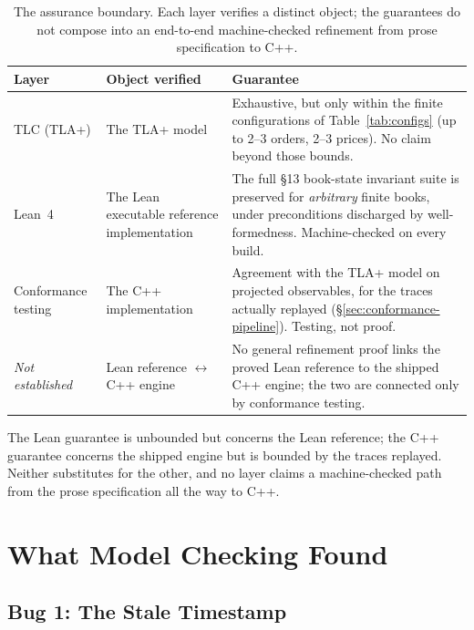 \documentclass[11pt,a4paper]{article}
\begin{document}
\begin{table}[H]
\centering
\caption{The assurance boundary. Each layer verifies a distinct object;
the guarantees do not compose into an end-to-end machine-checked
refinement from prose specification to C++.}
\label{tab:assurance}
\small
\begin{tabular}{@{}lL{3.9cm}L{6.4cm}@{}}
\toprule
Layer & Object verified & Guarantee \\
\midrule
TLC (TLA+)          & The TLA+ model & Exhaustive, but only within the finite configurations of Table~\ref{tab:configs} (up to 2--3 orders, 2--3 prices). No claim beyond those bounds. \\
\addlinespace
Lean~4              & The Lean executable reference implementation & The full \S13 book-state invariant suite is preserved for \emph{arbitrary} finite books, under preconditions discharged by well-formedness. Machine-checked on every build. \\
\addlinespace
Conformance testing & The C++ implementation & Agreement with the TLA+ model on projected observables, for the traces actually replayed (\S\ref{sec:conformance-pipeline}). Testing, not proof. \\
\addlinespace
\emph{Not established} & Lean reference $\leftrightarrow$ C++ engine & No general refinement proof links the proved Lean reference to the shipped C++ engine; the two are connected only by conformance testing. \\
\bottomrule
\end{tabular}
\end{table}

The Lean guarantee is unbounded but concerns the Lean reference; the C++
guarantee concerns the shipped engine but is bounded by the traces
replayed. Neither substitutes for the other, and no layer claims a
machine-checked path from the prose specification all the way to C++.


\section{What Model Checking Found}
\label{sec:findings}

\subsection{Bug 1: The Stale Timestamp}
\label{sec:bug1}
\end{document}
